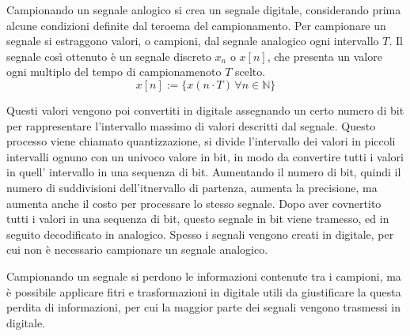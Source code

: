 \documentclass{article}
\numberwithin{equation}{subsection}
\begin{document}
Campionando un segnale anlogico si crea un segnale digitale, considerando prima alcune condizioni definite dal teroema del campionamento. Per campionare un segnale si estraggono
valori, o campioni, dal segnale analogico ogni intervallo $T$. Il segnale così ottenuto è un segnale discreto $x_n$ o $x[n]$, che presenta un valore ogni multiplo del tempo di campionamenoto $T$ 
scelto. 
\begin{equation*}
    x[n]:=\{x(n\cdot T)\,\forall n\in\mathbb{N}\}
\end{equation*}

\begin{center}
\end{center}

Questi valori vengono poi convertiti in digitale assegnando un certo numero di bit per rappresentare l'intervallo massimo di valori descritti dal segnale. Questo processo 
viene chiamato quantizzazione, si divide l'intervallo dei valori in piccoli intervalli ognuno con un univoco valore in bit, in modo da convertire tutti i valori in quell'
intervallo in una sequenza di bit. Aumentando il numero di bit, quindi il numero di suddivisioni dell'itnervallo di partenza, aumenta la precisione, ma aumenta anche il costo 
per processare lo stesso segnale. Dopo aver covnertito tutti i valori in una sequenza di bit, questo segnale in bit viene tramesso, ed in seguito decodificato in analogico. 
Spesso i segnali vengono creati in digitale, per cui non è necessario campionare un segnale analogico. 


Campionando un segnale si perdono le informazioni contenute tra i campioni, ma è possibile applicare fitri e trasformazioni in digitale utili da giustificare la questa perdita 
di informazioni, per cui la maggior parte dei segnali vengono trasmessi in digitale. 
\end{document}
